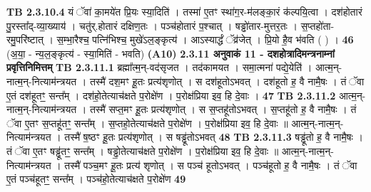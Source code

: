 \documentclass[17pt]{extarticle}
\begin{document}
                  \newline
                                \textbf{ TB 2.3.10.4} \newline
                  यं ॅवा॑ का॒मये॑त प्रि॒यः स्या॒दिति॑ । तस्मा॑ ए॒तꣳ स्था॑ग॒र-म॑लङ्का॒रं क॑ल्पयि॒त्वा । दश॑होतारं पु॒रस्ता᳚द्-व्या॒ख्याय॑ । चतु॑र्.होतारं दक्षिण॒तः । पञ्च॑होतारं प॒श्चात् । षड्ढो॑तार-मुत्तर॒तः । स॒प्तहो॑ता-रमु॒परि॑ष्टात् । स॒म्भा॒रैश्च॒ पत्नि॑भिश्च॒ मुखे॑ऽल॒ङ्कृत्य॑ । आऽस्यार्द्धं ॅव्र॑जेत् । प्रि॒यो है॒व भ॑वति ( ) । \textbf{ 46} \newline
                  \newline
                                    (अ॒या॒ - न्य॒ल॒ङ्कृत्य॑ - स्या॒मिति॑ - भवति) \textbf{(A10)} \newline \newline
                \textbf{ 2.3.11    अनुवाकं   11 - दशहोत्रादिमन्त्रनाम्नां प्रवृत्तिनिमित्तम्} \newline
                                \textbf{ TB 2.3.11.1} \newline
                  ब्रह्मा᳚त्म॒न्-वद॑सृजत । तद॑कामयत । समा॒त्मना॑ पद्ये॒येति॑ । आत्म॒न्-नात्म॒न्-नित्याम॑न्त्रयत । तस्मै॑ दश॒मꣳ हू॒तः प्रत्य॑शृणोत् । स दश॑हूतोऽभवत् । दश॑हूतो ह॒ वै नामै॒षः । तं ॅवा ए॒तं दश॑हूतꣳ॒॒ सन्त᳚म् । दश॑हो॒तेत्याच॑क्षते प॒रोक्षे॑ण । प॒रोक्ष॑प्रिया इव॒ हि दे॒वाः । \textbf{ 47} \newline
                  \newline
                                \textbf{ TB 2.3.11.2} \newline
                  आत्म॒न्-नात्म॒न्-नित्याम॑न्त्रयत । तस्मै॑ सप्त॒मꣳ हू॒तः प्रत्य॑शृणोत् । स स॒प्तहू॑तोऽभवत् । स॒प्तहू॑तो ह॒ वै नामै॒षः । तं ॅवा ए॒तꣳ स॒प्तहू॑तꣳ॒॒ सन्त᳚म् । स॒प्तहो॒तेत्याच॑क्षते प॒रोक्षे॑ण । प॒रोक्ष॑प्रिया इव॒ हि दे॒वाः ॥ आत्म॒न्-नात्म॒न्-नित्याम॑न्त्रयत । तस्मै॑ ष॒ष्ठꣳ हू॒तः प्रत्य॑शृणोत् । स षड्ढू॑तोऽभवत् \textbf{ 48} \newline
                  \newline
                                \textbf{ TB 2.3.11.3} \newline
                  षड्ढू॑तो ह॒ वै नामै॒षः । तं ॅवा ए॒तꣳ षड्ढू॑तꣳ॒॒ सन्त᳚म् । षड्ढो॒तेत्याच॑क्षते प॒रोक्षे॑ण । प॒रोक्ष॑प्रिया इव॒ हि दे॒वाः ॥ आत्म॒न्-नात्म॒न्-नित्याम॑न्त्रयत । तस्मै॑ पञ्च॒मꣳ हू॒तः प्रत्य॑ शृणोत् । स पञ्च॑ हूतोऽभवत् । पञ्च॑हूतो ह॒ वै नामै॒षः । तं ॅवा ए॒तं पञ्च॑हूतꣳ॒॒ सन्त᳚म् । पञ्च॑हो॒तेत्याच॑क्षते प॒रोक्षे॑ण \textbf{ 49} \newline
                  \newline
\end{document}
